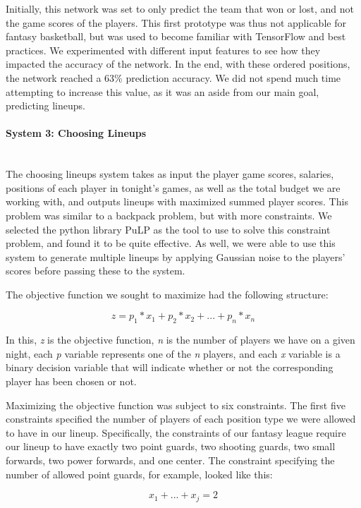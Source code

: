 Initially, this network was set to only predict the team that won or lost, and not the game scores of the players. This first prototype was thus not applicable for fantasy basketball, but was used to become familiar with TensorFlow and best practices. We experimented with different input features to see how they impacted the accuracy of the network. In the end, with these ordered positions, the network reached a 63\% prediction accuracy. %
We did not spend much time attempting to increase this value, as it was an aside from our main goal, predicting lineups.


\paragraph{System 3: Choosing Lineups}\mbox{}\\
The choosing lineups system takes as input the player game scores, salaries, positions of each player in tonight's games, as well as the total budget we are working with, and outputs lineups with maximized summed player scores. This problem was similar to a backpack problem, but with more constraints. We selected the python library PuLP as the tool to use to solve this constraint problem, and found it to be quite effective. As well, we were able to use this system to generate multiple lineups by applying Gaussian noise to the players' scores before passing these to the system.

The objective function we sought to maximize had the following structure:

\[ z = p_1*x_1 + p_2*x_2 + ... + p_n*x_n \]

In this, \textit{z} is the objective function, \textit{n} is the number of players we have on a given night, each \textit{p} variable represents one of the \textit{n} players, and each \textit{x} variable is a binary decision variable that will indicate whether or not the corresponding player has been chosen or not.

Maximizing the objective function was subject to six constraints. The first five constraints specified the number of players of each position type we were allowed to have in our lineup. Specifically, the constraints of our fantasy league require our lineup to have exactly two point guards, two shooting guards, two small forwards, two power forwards, and one center. The constraint specifying the number of allowed point guards, for example, looked like this:

\[ x_1 + ... + x_j = 2 \]

